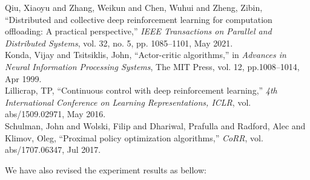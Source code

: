 \documentclass[12pt,draftclsnofoot,onecolumn]{IEEEtran}
\newcommand{\rev}[1]{{\color{blue}#1}} %
\newcommand{\rev}[1]{#1}
\newenvironment{my}[2]%
{\begin{list}{}%
{\setlength{\rightmargin}{#1}\setlength{\leftmargin}{#2}}%


 \item[]{}

} {\end{list}}
\begin{document}
\begin{enumerate}
	\begin{my}{1cm}{1cm}
	\rev{
		{\small
			\noindent\hspace{-0.5mm}\cite{qiu2020distributed} Qiu, Xiaoyu and Zhang, Weikun and Chen, Wuhui and Zheng, Zibin, ``Distributed and collective deep reinforcement learning for computation offloading: A practical perspective,'' \textit{IEEE Transactions on Parallel and Distributed Systems}, vol. 32, no. 5, pp. 1085--1101, May 2021.\\[10pt]
			\cite{NIPS1999_6449f44a} Konda, Vijay and Tsitsiklis, John, ``Actor-critic algorithms,'' in \textit{Advances in Neural Information Processing Systems}, The {MIT} Press, vol. 12, pp.1008--1014, Apr 1999.\\[10pt]
			\cite{lillicrap2015continuous} Lillicrap, TP, ``Continuous control with deep reinforcement learning,'' \textit{4th International Conference on Learning Representations, {ICLR}}, vol. abs/1509.02971, May 2016.\\[10pt]
			\cite{schulman2017proximal} Schulman, John and Wolski, Filip and Dhariwal, Prafulla and Radford, Alec and Klimov, Oleg, ``Proximal policy optimization algorithms,'' \textit{CoRR}, vol. abs/1707.06347, Jul 2017.}\\}
\end{my}




We have also revised the experiment results as bellow: 

\setcounter{figure}{2}


\end{enumerate}
\end{document}
